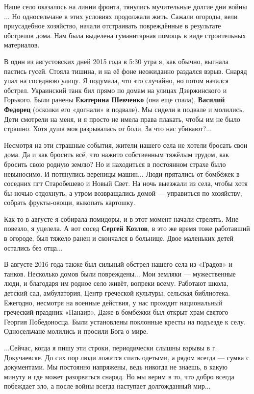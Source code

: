 \documentclass[a4paper,11pt]{extreport}
\def\name#1{{\bfseries\color{blue} #1}}
\begin{document}
Наше село оказалось на линии фронта, тянулись мучительные долгие дни войны$\ldots$ Но
односельчане в этих условиях продолжали жить. Сажали огороды, вели приусадебное
хозяйство, начали отстраивать повреждённые в результате обстрелов дома. Нам
была выделена гуманитарная помощь в виде строительных материалов.

В один из августовских дней 2015 года в 5:30 утра я, как обычно, выгнала
пастись гусей. Стояла тишина, и на её фоне неожиданно раздался взрыв. Снаряд
упал на соседнюю улицу. Я подумала, что это случайно, но потом начался обстрел.
Украинский танк бил прямо по домам на улицах Дзержинского и Горького. Были
ранены \name{Екатерина Шевченко} (она еще спала), \name{Василий Федорец} (осколки его
«догнали» в подвале). Мы сидели в подвале и молились. Дети смотрели на меня, и
я просто не имела права плакать, чтобы им не было страшно. Хотя душа моя
разрывалась от боли. За что нас убивают?$\ldots$

Несмотря на эти страшные события, жители нашего села не хотели бросать свои
дома. Да и как бросить всё, что нажито собственным тяжёлым трудом, как бросить
свою родную землю? Но и находиться в постоянном страхе было невыносимо. И
потянулись вереницы машин$\ldots$ Люди прятались от бомбёжек в соседних пгт
Старобешево и Новый Свет. На ночь выезжали из села, чтобы хотя бы ночью
отдохнуть, а утром возвращались домой --- управиться по хозяйству, собрать
фрукты-овощи, выкопать картошку.

Как-то в августе я собирала помидоры, и в этот момент начали стрелять. Мне
повезло, я уцелела. А вот сосед \name{Сергей Козлов}, в это же время тоже работавший в
огороде, был тяжело ранен и скончался в больнице. Двое маленьких детей остались
без отца$\ldots$

В августе 2016 года также был сильный обстрел нашего села из «Градов» и танков.
Несколько домов были повреждены$\ldots$ Мои земляки --- мужественные люди, и благодаря
им родное село живёт, вопреки всему. Работают школа, детский сад, амбулатория,
Центр греческой культуры, сельская библиотека. Ежегодно, несмотря на военные
действия, у нас проходит национальный греческий праздник «Панаир». Даже в
бомбёжки был открыт храм святого Георгия Победоносца. Были установлены
поклонные кресты на подъезде к селу. Односельчане молились и просили Бога о
мире.

$\ldots$Сейчас, когда я пишу эти строки, периодически слышны взрывы в г. Докучаевске.
До сих пор люди ложатся спать одетыми, а рядом всегда --- сумка с документами. Мы
постоянно напряжены, ведь никогда не знаешь, в какую минуту и где может
разорваться снаряд. Но мы верим в то, что добро всегда побеждает зло, а после
войны всегда наступает долгожданный мир$\ldots$
\end{document}
